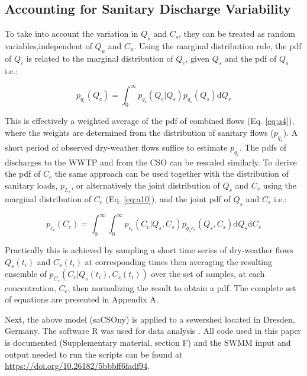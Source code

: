 \documentclass[draft,linenumbers]{agujournal2018}
\begin{document}
\subsection{Accounting for Sanitary Discharge Variability}
To take into account the variation in $Q_s$ and $C_s$, they can be treated as random variables,independent of $Q_u$ and $C_u$. Using the marginal distribution rule, the pdf of $Q_c$ is related to the marginal distribution of $Q_c$, given $Q_s$ and the pdf of $Q_s$ i.e.:
\begin{linenomath*}
\begin{equation}
p_{q_c}\left(Q_c\right) = \int_{0}^{\infty} p_{q_c} \left(Q_c | Q_s\right) p_{q_s}\left(Q_s\right)\mathrm{d} Q_s
\label{eq:four}
\end{equation}
\end{linenomath*}
This is ef\/fectively a weighted average of the pdf of combined f\/lows (Eq. \ref{eq:a4}), where the weights are determined from the distribution of sanitary f\/lows ($p_{q_s}$). A short period of observed dry-weather f\/lows suf\/f\/ice to estimate $p_{q_s}$. The pdfs of discharges to the WWTP and from the CSO can be rescaled similarly. To derive the pdf of $C_c$ the same approach can be used together with the distribution of sanitary loads, $p_{L_s}$, or alternatively the joint distribution of $Q_s$ and $C_s$ using the marginal distribution of $C_c$ (Eq. \ref{eq:a10}), and the joint pdf of $Q_s$ and $C_s$ i.e.: 
\begin{linenomath*}
\begin{equation}
p_{c_c}\left(C_c\right) = \int_{0}^{\infty}\int_{0}^{\infty}p_{c_c}\left(C_c | Q_s ,C_s\right) p_{q_s c_s}\left(Q_s ,C_s\right) \mathrm{d}Q_s \mathrm{d}C_s
\label{eq:five}
\end{equation}
\end{linenomath*}
Practically this is achieved by sampling a short time series of dry-weather f\/lows $Q_{s}(t_i)$ and $C_{s}(t_i)$ at corresponding times then averaging the resulting ensemble of $p_{C_c}\left(C_c  | Q_s(t_i),C_s(t_i)\right)$ over the set of samples, at each concentration, $C_c$, then normalizing the result to obtain a pdf. The complete set of equations are presented in Appendix A. 

Next, the above model (saCSOny) is applied to a sewershed located in Dresden, Germany. The software R was used for data analysis \citep{RCore}. All code used in this paper is documented (Supplementary material, section F) and the SWMM input and output needed to run the scripts can be found at \url{https://doi.org/10.26182/5bbbff6fadf94}.
\end{document}
